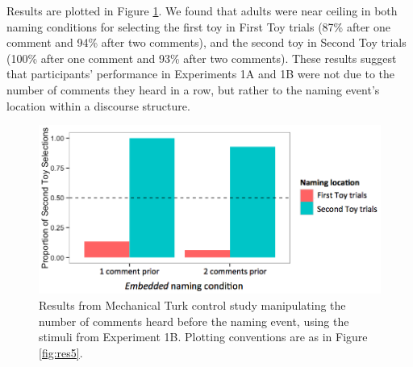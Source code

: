 \documentclass[man]{apa2}
\begin{document}
Results are plotted in Figure \ref{fig:control}. We found that adults were near ceiling in both naming conditions for selecting the first toy in First Toy trials (87\% after one comment and 94\% after two comments), and the second toy in Second Toy trials (100\% after one comment and 93\% after two comments).  These results suggest that participants' performance in Experiments 1A and 1B were not due to the number of comments they heard in a row, but rather to the naming event's location within a discourse structure.

\begin{figure}
  \begin{center} 
    \includegraphics[width=5in]{figures/continuity_turk_2and3comments.png} 
    \caption{\label{fig:control} Results from Mechanical Turk control study manipulating the number of comments heard before the naming event, using the stimuli from Experiment 1B. Plotting conventions are as in Figure \ref{fig:res5}.} 
  \end{center} 
\end{figure}
\end{document}
